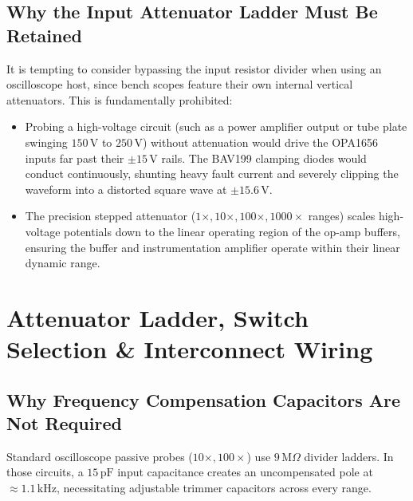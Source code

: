 \documentclass[11pt, letterpaper]{article}
\begin{document}
\subsection{Why the Input Attenuator Ladder Must Be Retained}
It is tempting to consider bypassing the input resistor divider when using an oscilloscope host, since bench scopes feature their own internal vertical attenuators. This is fundamentally prohibited:
\begin{itemize}[leftmargin=1.5em]
    \item Probing a high-voltage circuit (such as a power amplifier output or tube plate swinging $150\,\text{V}$ to $250\,\text{V}$) without attenuation would drive the OPA1656 inputs far past their $\pm 15\,\text{V}$ rails. The BAV199 clamping diodes would conduct continuously, shunting heavy fault current and severely clipping the waveform into a distorted square wave at $\pm 15.6\,\text{V}$.
    \item The precision stepped attenuator ($1\times, 10\times, 100\times, 1000\times$ ranges) scales high-voltage potentials down to the linear operating region of the op-amp buffers, ensuring the buffer and instrumentation amplifier operate within their linear dynamic range.
\end{itemize}

\section{Attenuator Ladder, Switch Selection \& Interconnect Wiring}

\subsection{Why Frequency Compensation Capacitors Are Not Required}
Standard oscilloscope passive probes ($10\times, 100\times$) use $9\,\text{M}\Omega$ divider ladders. In those circuits, a $15\,\text{pF}$ input capacitance creates an uncompensated pole at $\approx 1.1\,\text{kHz}$, necessitating adjustable trimmer capacitors across every range.
\end{document}
